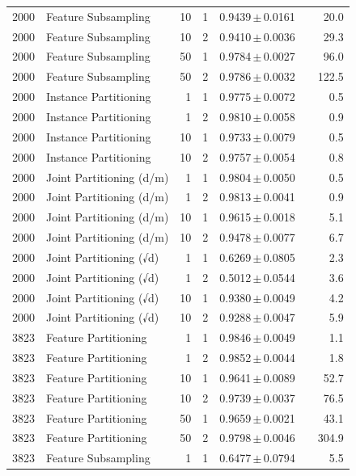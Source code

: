 \begin{table}[ht]
\begin{tabular}{rlrrccr}
2000 & Feature Subsampling & 10 & 1 & 0.9439\,$\pm$\,0.0161 &  & 20.0 \\
2000 & Feature Subsampling & 10 & 2 & 0.9410\,$\pm$\,0.0036 &  & 29.3 \\
2000 & Feature Subsampling & 50 & 1 & 0.9784\,$\pm$\,0.0027 &  & 96.0 \\
2000 & Feature Subsampling & 50 & 2 & 0.9786\,$\pm$\,0.0032 &  & 122.5 \\
2000 & Instance Partitioning & 1 & 1 & 0.9775\,$\pm$\,0.0072 &  & 0.5 \\
2000 & Instance Partitioning & 1 & 2 & 0.9810\,$\pm$\,0.0058 &  & 0.9 \\
2000 & Instance Partitioning & 10 & 1 & 0.9733\,$\pm$\,0.0079 &  & 0.5 \\
2000 & Instance Partitioning & 10 & 2 & 0.9757\,$\pm$\,0.0054 &  & 0.8 \\
2000 & Joint Partitioning (d/m) & 1 & 1 & 0.9804\,$\pm$\,0.0050 &  & 0.5 \\
2000 & Joint Partitioning (d/m) & 1 & 2 & 0.9813\,$\pm$\,0.0041 &  & 0.9 \\
2000 & Joint Partitioning (d/m) & 10 & 1 & 0.9615\,$\pm$\,0.0018 &  & 5.1 \\
2000 & Joint Partitioning (d/m) & 10 & 2 & 0.9478\,$\pm$\,0.0077 &  & 6.7 \\
2000 & Joint Partitioning (√d) & 1 & 1 & 0.6269\,$\pm$\,0.0805 &  & 2.3 \\
2000 & Joint Partitioning (√d) & 1 & 2 & 0.5012\,$\pm$\,0.0544 &  & 3.6 \\
2000 & Joint Partitioning (√d) & 10 & 1 & 0.9380\,$\pm$\,0.0049 &  & 4.2 \\
2000 & Joint Partitioning (√d) & 10 & 2 & 0.9288\,$\pm$\,0.0047 &  & 5.9 \\
3823 & Feature Partitioning & 1 & 1 & 0.9846\,$\pm$\,0.0049 &  & 1.1 \\
3823 & Feature Partitioning & 1 & 2 & 0.9852\,$\pm$\,0.0044 &  & 1.8 \\
3823 & Feature Partitioning & 10 & 1 & 0.9641\,$\pm$\,0.0089 &  & 52.7 \\
3823 & Feature Partitioning & 10 & 2 & 0.9739\,$\pm$\,0.0037 &  & 76.5 \\
3823 & Feature Partitioning & 50 & 1 & 0.9659\,$\pm$\,0.0021 &  & 43.1 \\
3823 & Feature Partitioning & 50 & 2 & 0.9798\,$\pm$\,0.0046 &  & 304.9 \\
3823 & Feature Subsampling & 1 & 1 & 0.6477\,$\pm$\,0.0794 &  & 5.5 \\

\end{tabular}
\end{table}
